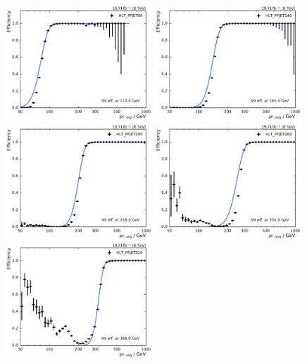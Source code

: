 \begin{figure}[htbp]
    \centering
    \includegraphics[width=0.49\textwidth]{figures/measurement/trigger_eff_HLT_PFJET80_default.pdf}\hfill
    \includegraphics[width=0.49\textwidth]{figures/measurement/trigger_eff_HLT_PFJET140_default.pdf}
    \includegraphics[width=0.49\textwidth]{figures/measurement/trigger_eff_HLT_PFJET200_default.pdf}\hfill
    \includegraphics[width=0.49\textwidth]{figures/measurement/trigger_eff_HLT_PFJET260_default.pdf}
    \includegraphics[width=0.49\textwidth]{figures/measurement/trigger_eff_HLT_PFJET320_default.pdf}\hfill

\end{figure}
